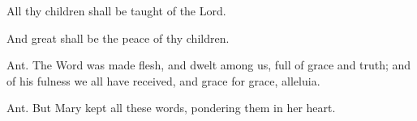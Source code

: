 \documentclass[12pt]{book}
\begin{document}
\bigrule


\begin{enpars}\noindent \vv All thy children shall be taught of the Lord.

\noindent \rr And great shall be the peace of thy children.
 \end{enpars}
 
 \bigrule
 
 

 
 \begin{enpars} \noindent Ant. The Word was made flesh, and dwelt among us, full of grace and truth; and of his fulness we all have received, and grace for grace, alleluia.\end{enpars}
 
 \bigrule

 
 \begin{enpars} \noindent Ant. But Mary kept all these words, pondering them in her heart. \end{enpars}
 
  \bigrule
 

   \smallskip%
    \noindent%
    
    \begin{enumerate}[label=\arabic*.,%
			leftmargin=0pt, %
			itemindent=0mm, %
			labelsep=3pt, %
			labelwidth=0pt, %
			rightmargin=0pt, %
			parsep=0pt, %
			topsep=0pt, %
			itemsep=0pt,%
			start=3]
			 
			    \end{enumerate}



\end{document}
